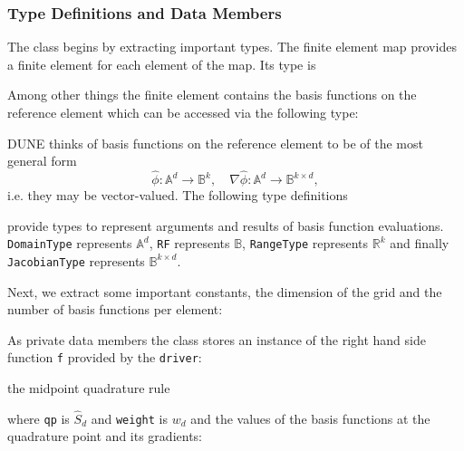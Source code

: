\documentclass[a4paper,12pt]{article}
\begin{document}
\subsubsection*{Type Definitions and Data Members}

The class begins by extracting important types. The finite element
map provides a finite element for each element of the map. Its type is


Among other things the finite element contains the basis functions
on the reference element which can be accessed via the following type:


DUNE thinks of basis functions on the reference element to be of
the most general form 
$$\hat\phi : \mathbb{A}^d \to \mathbb{B}^k, \quad 
\nabla\hat\phi : \mathbb{A}^d \to \mathbb{B}^{k\times d},$$
i.e. they may be vector-valued. The following type definitions

provide types to represent arguments and results of basis function
evaluations. \lstinline{DomainType} represents $\mathbb{A}^d$,
\lstinline{RF} represents $\mathbb{B}$, \lstinline{RangeType}
represents $\mathbb{R}^k$ and finally \lstinline{JacobianType}
represents $\mathbb{B}^{k\times d}$.

Next, we extract some important constants, the dimension 
of the grid and the number of basis functions per element:


As private data members the class stores an instance of the right
hand side function \lstinline{f} provided by the \lstinline{driver}:

the midpoint quadrature rule

where \lstinline{qp} is $\hat S_d$ and \lstinline{weight} is
$w_d$ and the values of the basis functions at the quadrature
point and its gradients:

\end{document}

